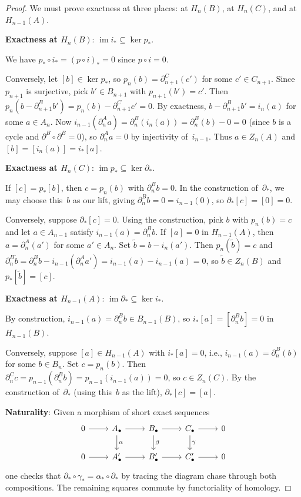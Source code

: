 \documentclass[12pt,a4paper,openany]{book}
\theoremstyle{definition}
\theoremstyle{plain}
\theoremstyle{remark}
\DeclareMathOperator{\im}{im}
\begin{document}
\begin{proof}
We must prove exactness at three places: at $H_n(B)$, at $H_n(C)$, and
at $H_{n-1}(A)$.

\medskip\noindent
\textbf{Exactness at $H_n(B)$}: $\im i_*\subseteq\ker p_*$.

We have $p_*\circ i_*=(p\circ i)_*=0$ since $p\circ i=0$.

\medskip
Conversely, let $[b]\in\ker p_*$, so $p_n(b)=\partial^C_{n+1}(c')$ for some
$c'\in C_{n+1}$.  Since $p_{n+1}$ is surjective, pick $b'\in B_{n+1}$
with $p_{n+1}(b')=c'$.  Then $p_n(b-\partial^B_{n+1}b')=p_n(b)-\partial^C_{n+1}c'=0$.
By exactness, $b-\partial^B_{n+1}b'=i_n(a)$ for some $a\in A_n$.
Now $i_{n-1}(\partial^A_n a)=\partial^B_n(i_n(a))=\partial^B_n(b)-0=0$
(since $b$ is a cycle and $\partial^B\circ\partial^B=0$), so $\partial^A_n a=0$
by injectivity of~$i_{n-1}$.  Thus $a\in Z_n(A)$ and
$[b]=[i_n(a)]=i_*[a]$.

\medskip\noindent
\textbf{Exactness at $H_n(C)$}: $\im p_*\subseteq\ker\partial_*$.

If $[c]=p_*[b]$, then $c=p_n(b)$ with $\partial^B_n b=0$.
In the construction of~$\partial_*$, we may choose this~$b$ as our
lift, giving $\partial^B_n b=0=i_{n-1}(0)$, so $\partial_*[c]=[0]=0$.

\medskip
Conversely, suppose $\partial_*[c]=0$.  Using the construction, pick
$b$ with $p_n(b)=c$ and let $a\in A_{n-1}$ satisfy
$i_{n-1}(a)=\partial^B_n b$.  If $[a]=0$ in $H_{n-1}(A)$, then
$a=\partial^A_n(a')$ for some $a'\in A_n$.  Set $\tilde{b}=b-i_n(a')$.
Then $p_n(\tilde b)=c$ and
$\partial^B_n\tilde{b}=\partial^B_n b-i_{n-1}(\partial^A_n a')=i_{n-1}(a)-i_{n-1}(a)=0$, so $\tilde{b}\in Z_n(B)$ and
$p_*[\tilde{b}]=[c]$.

\medskip\noindent
\textbf{Exactness at $H_{n-1}(A)$}: $\im\partial_*\subseteq\ker i_*$.

By construction, $i_{n-1}(a)=\partial^B_n b\in B_{n-1}(B)$, so
$i_*[a]=[\partial^B_n b]=0$ in $H_{n-1}(B)$.

\medskip
Conversely, suppose $[a]\in H_{n-1}(A)$ with $i_*[a]=0$, i.e.,
$i_{n-1}(a)=\partial^B_n(b)$ for some $b\in B_n$.  Set $c=p_n(b)$.
Then $\partial^C_n c=p_{n-1}(\partial^B_n b)=p_{n-1}(i_{n-1}(a))=0$,
so $c\in Z_n(C)$.  By the construction of~$\partial_*$ (using this~$b$
as the lift), $\partial_*[c]=[a]$.

\medskip\noindent
\textbf{Naturality}: Given a morphism of short exact sequences
\[
\begin{tikzcd}
  0 \ar[r] & A_\bullet \ar[r] \ar[d,"\alpha"] & B_\bullet \ar[r] \ar[d,"\beta"]
    & C_\bullet \ar[r] \ar[d,"\gamma"] & 0 \\
  0 \ar[r] & A'_\bullet \ar[r] & B'_\bullet \ar[r] & C'_\bullet \ar[r] & 0
\end{tikzcd}
\]
one checks that $\partial_*\circ\gamma_*=\alpha_*\circ\partial_*$ by tracing
the diagram chase through both compositions.  The remaining squares
commute by functoriality of homology.
\end{proof}
\end{document}
